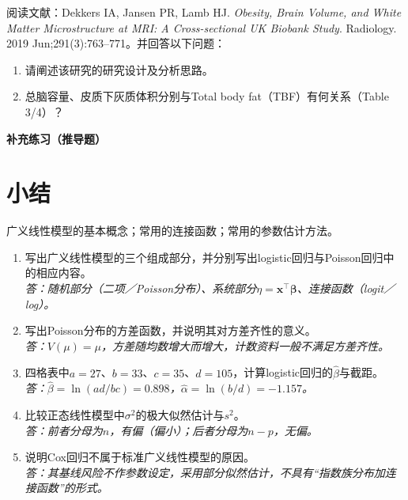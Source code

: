 阅读文献：Dekkers IA, Jansen PR, Lamb HJ. \textit{Obesity, Brain Volume, and White Matter Microstructure at MRI: A Cross-sectional UK Biobank Study}. Radiology. 2019 Jun;291(3):763--771。并回答以下问题：
\begin{enumerate}
\item 请阐述该研究的研究设计及分析思路。
\item 总脑容量、皮质下灰质体积分别与Total body fat（TBF）有何关系（Table 3/4）？
\end{enumerate}
\par{}\noindent\textbf{补充练习（推导题）}
\section*{小结}
广义线性模型的基本概念；常用的连接函数；常用的参数估计方法。

\begin{fuxi}[复习题]
\begin{enumerate}
\item 写出广义线性模型的三个组成部分，并分别写出logistic回归与Poisson回归中的相应内容。\\
\textit{答：随机部分（二项／Poisson分布）、系统部分$\eta=\bm x^\top\bm\beta$、连接函数（logit／log）。}
\item 写出Poisson分布的方差函数，并说明其对方差齐性的意义。\\
\textit{答：$V(\mu)=\mu$，方差随均数增大而增大，计数资料一般不满足方差齐性。}
\item 四格表中$a=27$、$b=33$、$c=35$、$d=105$，计算logistic回归的$\widehat\beta$与截距。\\
\textit{答：$\widehat\beta=\ln(ad/bc)=0.898$，$\widehat\alpha=\ln(b/d)=-1.157$。}
\item 比较正态线性模型中$\sigma^2$的极大似然估计与$s^2$。\\
\textit{答：前者分母为$n$，有偏（偏小）；后者分母为$n-p$，无偏。}
\item 说明Cox回归不属于标准广义线性模型的原因。\\
\textit{答：其基线风险不作参数设定，采用部分似然估计，不具有“指数族分布加连接函数”的形式。}
\end{enumerate}
\end{fuxi}

